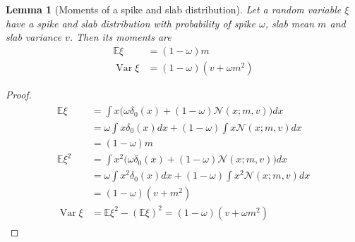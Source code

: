 \documentclass{article}
\newtheorem{lemma}{Lemma}
\begin{document}
\begin{lemma}[Moments of a spike and slab distribution]
\label{thm:moments_spsl}
Let a random variable $\xi$ have a spike and slab distribution with probability of spike $\omega$, slab mean $m$ and slab variance $v$. Then its moments are
\begin{subequations}
\begin{align}
\mathbb{E}\xi &= (1-\omega)m \\
\operatorname{Var}\xi & = (1-\omega)(v + \omega m^2)
\end{align}
\end{subequations}
\end{lemma}

\begin{proof}
\begin{align*}
\begin{split}
\mathbb{E}\xi &= \int x \big(\omega \delta_0(x) + (1 - \omega)\mathcal{N}(x; m, v)\big)dx \\
& = \omega \int x \delta_0(x)dx + (1 - \omega)\int x \mathcal{N}(x; m, v)dx \\
& = (1-\omega)m \\
\mathbb{E}\xi^2 &= \int x^2 \big(\omega \delta_0(x) + (1 - \omega)\mathcal{N}(x; m, v)\big)dx \\
& = \omega \int x^2 \delta_0(x)dx + (1 - \omega)\int x^2 \mathcal{N}(x; m, v)dx \\
& = (1-\omega)(v + m^2) \\
\operatorname{Var}\xi &= \mathbb{E}\xi^2 - \left(\mathbb{E}\xi\right)^2 = (1-\omega)(v + \omega m^2)
\end{split}
\end{align*}
\end{proof}
\end{document}
